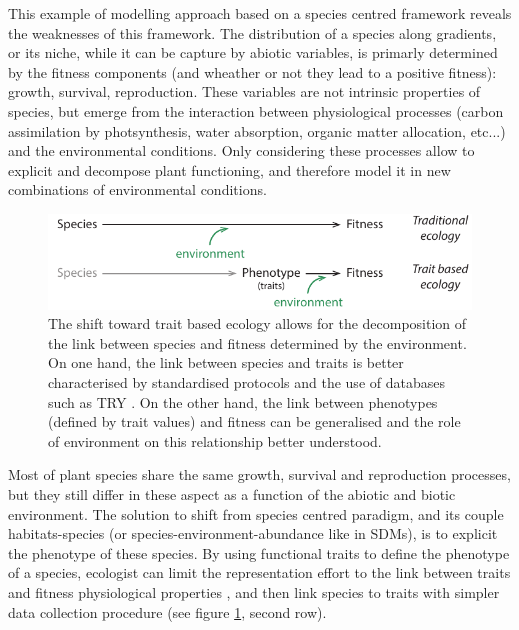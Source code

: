 This example of modelling approach based on a species centred framework reveals the weaknesses of this framework. The distribution of a species along gradients, or its niche, while it can be capture by abiotic variables, is primarly determined by the fitness components (and wheather or not they lead to a positive fitness): growth, survival, reproduction. These variables are not intrinsic properties of species, but emerge from the interaction between physiological processes (carbon assimilation by photsynthesis, water absorption, organic matter allocation, etc...) and the environmental conditions. Only considering these processes allow to explicit and decompose plant functioning, and therefore model it in new combinations of environmental conditions.

\begin{figure}
    \includegraphics[width=1\linewidth]{./2_PP/Figures/Concepts/species_to_fitness.pdf}
  \caption[From discrete to continuous link between species and fitness]{The shift toward trait based ecology allows for the decomposition of the link between species and fitness determined by the environment. On one hand, the link between species and traits is better characterised by standardised protocols and the use of databases such as TRY \parencite{TRY}. On the other hand, the link between phenotypes (defined by trait values) and fitness can be generalised and the role of environment on this relationship better understood.}
  \label{fig:paradigm_shift}
\end{figure}

Most of plant species share the same growth, survival and reproduction processes, but they still differ in these aspect as a function of the abiotic and biotic environment. The solution to shift from species centred paradigm, and its couple habitats-species (or species-environment-abundance like in SDMs), is to explicit the phenotype of these species. By using functional traits to define the phenotype of a species, ecologist can limit the representation effort to the link between traits and fitness physiological properties \parencite{reich_leaf_1992}, and then link species to traits with simpler data collection procedure \parencite{cornelissen_handbook_2003} (see figure \ref{fig:paradigm_shift}, second row).


